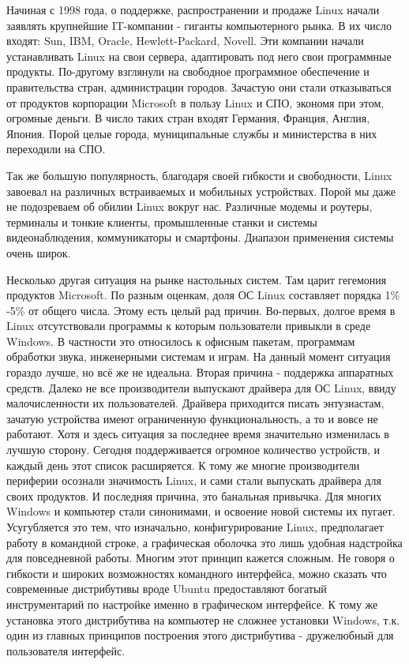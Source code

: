 \documentclass[bachelor, och, referat, times]{SCWorks}
\begin{document}
\par Начиная с 1998 года, о поддержке, 
распространении и продаже Linux 
начали заявлять крупнейшие IT-компании - гиганты 
компьютерного рынка. В их
число входят: Sun, IBM, Oracle, Hewlett-Packard, 
Novell. Эти компании 
начали устанавливать Linux на свои сервера, 
адаптировать под него свои 
программные продукты. По-другому взглянули на 
свободное программное 
обеспечение и правительства стран, администрации 
городов. Зачастую они 
стали отказываться от продуктов корпорации 
Microsoft в пользу Linux и СПО,
экономя при этом, огромные деньги. В число таких 
стран входят Германия, 
Франция, Англия, Япония. Порой целые города, 
муниципальные службы и 
министерства в них переходили на СПО.

\par Так же большую популярность, благодаря своей 
гибкости и свободности, 
Linux завоевал на различных встраиваемых и 
мобильных устройствах. Порой мы
даже не подозреваем об обилии Linux вокруг нас. 
Различные модемы и 
роутеры, терминалы и тонкие клиенты, промышленные 
станки и системы 
видеонаблюдения, коммуникаторы и смартфоны. 
Диапазон применения системы 
очень широк.

\par Несколько другая ситуация на рынке настольных 
систем. Там царит 
гегемония продуктов Microsoft. По разным оценкам, 
доля ОС Linux составляет
порядка 1\% -5\% от общего числа. Этому есть целый 
рад причин. Во-первых, 
долгое время в Linux отсутствовали программы к 
которым пользователи 
привыкли в среде Windows. В частности это 
относилось к офисным пакетам, 
программам обработки звука, инженерными системам и 
играм. На данный момент
ситуация гораздо лучше, но всё же не идеальна. 
Вторая причина - поддержка 
аппаратных средств. Далеко не все производители 
выпускают драйвера для ОС 
Linux, ввиду малочисленности их пользователей. 
Драйвера приходится писать 
энтузиастам, зачатую устройства имеют ограниченную 
функциональность, а то 
и вовсе не работают. Хотя и здесь ситуация за 
последнее время значительно 
изменилась в лучшую сторону. Сегодня поддерживается 
огромное количество 
устройств, и каждый день этот список расширяется. К 
тому же многие 
производители периферии осознали значимость Linux, 
и сами стали выпускать 
драйвера для своих продуктов. И последняя причина, 
это банальная привычка.
Для многих Windows и компьютер стали синонимами, и 
освоение новой системы 
их пугает. Усугубляется это тем, что изначально, 
конфигурирование Linux, 
предполагает работу в командной строке, а 
графическая оболочка это лишь 
удобная надстройка для повседневной работы. Многим 
этот принцип кажется 
сложным. Не говоря о гибкости и широких 
возможностях командного 
интерфейса, можно сказать что современные 
дистрибутивы вроде Ubuntu 
предоставляют богатый инструментарий по настройке 
именно в графическом 
интерфейсе. К тому же установка этого дистрибутива 
на компьютер не сложнее
установки Windows, т.к. один из главных принципов 
построения этого 
дистрибутива - дружелюбный для пользователя 
интерфейс.
\end{document}
